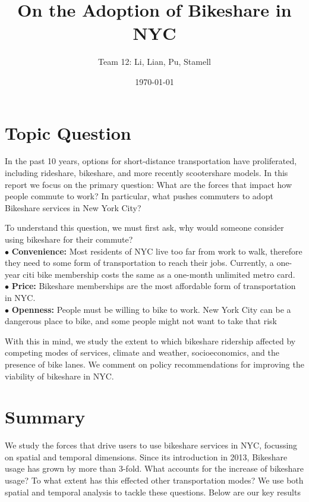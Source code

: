 \documentclass[12pt]{article}
\title{On the Adoption of Bikeshare in NYC}
\author{Team 12: Li, Lian, Pu, Stamell}
\date{\today}
\begin{document}
\begin{titlepage}
\maketitle
\end{titlepage}

\linespread{1.15} %
\section*{Topic Question}
In the past 10 years, options for short-distance transportation have proliferated, including rideshare, bikeshare, and more recently scootershare models. In this report we focus on the primary question: What are the forces that impact how people commute to work? In particular, what pushes commuters to adopt Bikeshare services in New York City?

\par To understand this question, we must first ask, why would someone consider using bikeshare for their commute?\\
$\bullet$ \textbf{Convenience:} Most residents of NYC live too far from work to walk, therefore they need to some form of transportation to reach their jobs. Currently, a one-year citi bike membership costs the same as a one-month unlimited metro card.\\
$\bullet$ \textbf{Price:} Bikeshare memberships are the most affordable form of transportation in NYC. \\
$\bullet$ \textbf{Openness:} People must be willing to bike to work. New York City can be a dangerous place to bike, and some people might not want to take that risk\\


\par With this in mind, we study the extent to which bikeshare ridership affected by competing modes of services, climate and weather, socioeconomics, and the presence of bike lanes. We comment on policy recommendations for improving the viability of bikeshare in NYC.
\section*{Summary}
We study the forces that drive users to use bikeshare services in NYC, focussing on spatial and temporal dimensions. Since its introduction in 2013, Bikeshare usage has grown by more than 3-fold. What accounts for the increase of bikeshare usage? To what extent has this effected other transportation modes? We use both spatial and temporal analysis to tackle these questions. Below are our key results
\end{document}
